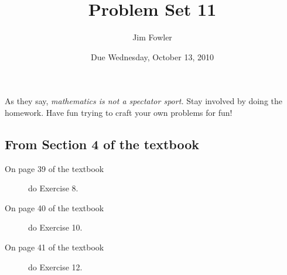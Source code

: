 \documentclass[12pt]{handout}
\author{Jim Fowler}
\title{Problem Set 11}
\date{Due Wednesday, October 13, 2010}
\begin{document}
\maketitle




As they say, \textit{mathematics is not a spectator sport.}  Stay involved by doing the homework.  Have fun trying to craft your own problems for fun!







\subsection*{From Section 4 of the textbook}



\begin{description}

\item[On page 39 of the textbook] do Exercise 8.

\item[On page 40 of the textbook] do Exercise 10.

\item[On page 41 of the textbook] do Exercise 12.

\end{description}
\end{document}
